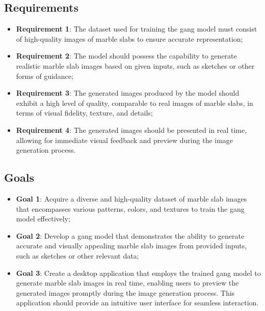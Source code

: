 \subsection{Requirements}
\begin{itemize}
    \item \textbf{Requirement 1}: The dataset used for training the \gls{gang} model must consist of high-quality images of marble slabs to ensure accurate representation;
    \item \textbf{Requirement 2}: The model should possess the capability to generate realistic marble slab images based on given inputs, such as sketches or other forms of guidance;
    \item \textbf{Requirement 3}: The generated images produced by the model should exhibit a high level of quality, comparable to real images of marble slabs, in terms of visual fidelity, texture, and details;
    \item \textbf{Requirement 4}: The generated images should be presented in real time, allowing for immediate visual feedback and preview during the image generation process.
\end{itemize}
\subsection{Goals}
\begin{itemize}
    \item \textbf{Goal 1}: Acquire a diverse and high-quality dataset of marble slab images that encompasses various patterns, colors, and textures to train the \gls{gang} model effectively;
    \item \textbf{Goal 2}: Develop a \gls{gang} model that demonstrates the ability to generate accurate and visually appealing marble slab images from provided inputs, such as sketches or other relevant data;
    \item \textbf{Goal 3}: Create a desktop application that employs the trained \gls{gang} model to generate marble slab images in real time, enabling users to preview the generated images promptly during the image generation process. 
    This application should provide an intuitive user interface for seamless interaction.
\end{itemize}
